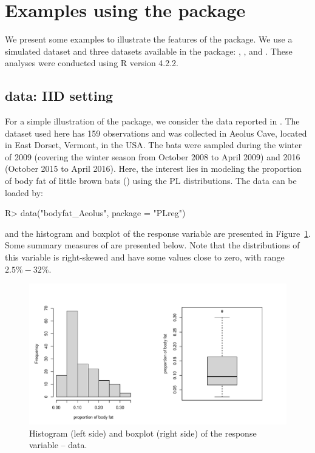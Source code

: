 \section[R code]{Examples using the  package} \label{sec:illustrations}

We present some examples to illustrate the features of the  package. We use a simulated dataset and three datasets available in the package: , , and . These analyses were conducted using R version 4.2.2.

\subsection{ data: IID setting}\label{bodyfatiid}

For a simple illustration of the  package, we consider the  data reported in \cite{Chengetal2019}. The dataset used here has 159 observations and was collected in Aeolus Cave, located in East Dorset, Vermont, in the USA. The bats were sampled during the winter of 2009 (covering the winter season from October 2008 to April 2009) and 2016 (October 2015 to April 2016). Here, the interest lies in modeling the proportion of body fat of little brown bats () using the PL distributions. The data can be loaded by:
%
\begin{Schunk}
\begin{Sinput}
R> data("bodyfat_Aeolus", package = "PLreg")
\end{Sinput}
\end{Schunk}
%
and the histogram and boxplot of the response variable are presented in Figure~\ref{fig:Fig2}. Some summary measures of  are presented below. Note that the distributions of this variable is right-skewed and have some values close to zero, with range $2.5\%-32\%$.
\begin{figure}[t!]
\centering
\includegraphics[scale=0.6]{figures/Fig2}
\caption{\label{fig:Fig2} Histogram (left side) and boxplot (right side) of the response variable --  data.}
\end{figure}

